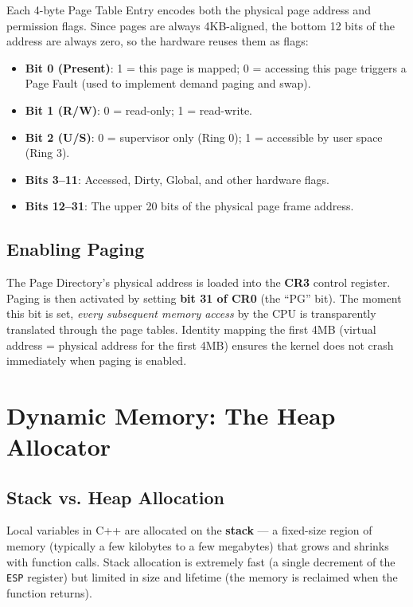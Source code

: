 \documentclass[12pt,a4paper]{report}
\begin{document}
Each 4-byte Page Table Entry encodes both the physical page address and permission flags.
Since pages are always 4KB-aligned, the bottom 12 bits of the address are always zero,
so the hardware reuses them as flags:

\begin{itemize}
    \item \textbf{Bit 0 (Present)}: 1 = this page is mapped; 0 = accessing this page
    triggers a Page Fault (used to implement demand paging and swap).
    \item \textbf{Bit 1 (R/W)}: 0 = read-only; 1 = read-write.
    \item \textbf{Bit 2 (U/S)}: 0 = supervisor only (Ring 0); 1 = accessible by user
    space (Ring 3).
    \item \textbf{Bits 3--11}: Accessed, Dirty, Global, and other hardware flags.
    \item \textbf{Bits 12--31}: The upper 20 bits of the physical page frame address.
\end{itemize}

\subsection{Enabling Paging}

The Page Directory's physical address is loaded into the \textbf{CR3} control register.
Paging is then activated by setting \textbf{bit 31 of CR0} (the ``PG'' bit). The moment
this bit is set, \textit{every subsequent memory access} by the CPU is transparently
translated through the page tables. Identity mapping the first 4MB (virtual address =
physical address for the first 4MB) ensures the kernel does not crash immediately when
paging is enabled.

\section{Dynamic Memory: The Heap Allocator}

\subsection{Stack vs. Heap Allocation}

Local variables in C++ are allocated on the \textbf{stack} --- a fixed-size region of
memory (typically a few kilobytes to a few megabytes) that grows and shrinks with
function calls. Stack allocation is extremely fast (a single decrement of the \texttt{ESP}
register) but limited in size and lifetime (the memory is reclaimed when the function returns).
\end{document}
